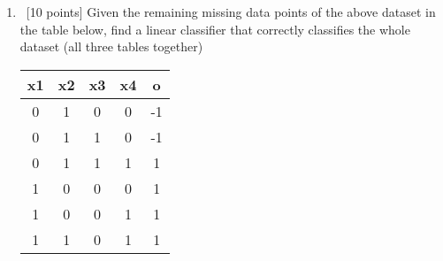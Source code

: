 \begin{enumerate}
    \item~[10 points] Given the remaining missing data points of the above dataset in the table below, find a linear classifier that correctly classifies the whole dataset (all three tables together)
        \begin{table}[h]
        \centering
        \begin{tabular}{cccc|c}
            x1 & x2 & x3 & x4 & o  \\ \hline
            0  & 1  & 0  & 0  & -1 \\
            0  & 1  & 1  & 0  & -1 \\
            0  & 1  & 1  & 1  & 1  \\
            1  & 0  & 0  & 0  & 1  \\
            1  & 0  & 0  & 1  & 1  \\
            1  & 1  & 0  & 1  & 1  \\
            \end{tabular}
        \end{table}
\end{enumerate}


